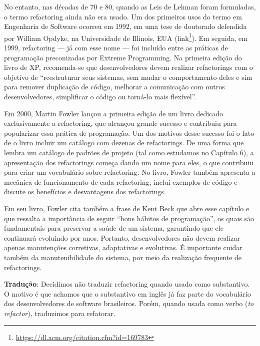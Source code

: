 \documentclass[
  11pt,
  twoside]{book}
\DeclareRobustCommand{\href}[2]{#2\footnote{\url{#1}}}
\newenvironment{aviso}{\centering \vspace{1.5ex} \begin{tcolorbox}[breakable, colback=backcolor, width=4.9in]}{\end{tcolorbox} \vspace{1.5ex}}
\begin{document}
 No entanto, nas décadas de 70 e 80, quando as
Leis de Lehman foram formuladas, o termo refactoring ainda não era
usado. Um dos primeiros usos do termo em Engenharia de Software ocorreu
em 1992, em uma tese de doutorado defendida por William Opdyke, na
Universidade de Illinois, EUA
(\href{https://dl.acm.org/citation.cfm?id=169783}{link}). Em seguida, em
1999, refactoring --- já com esse nome --- foi incluído entre as
práticas de programação preconizadas por Extreme Programming. Na
primeira edição do livro de XP, recomenda-se que desenvolvedores devem
realizar refactorings com o objetivo de ``reestruturar seus sistemas,
sem mudar o comportamento deles e sim para remover duplicação de código,
melhorar a comunicação com outros desenvolvedores, simplificar o código
ou torná-lo mais flexível''.

 Em 2000, Martin Fowler lançou a primeira edição
de um livro dedicado exclusivamente a refactoring, que alcançou grande
sucesso e contribuiu para popularizar essa prática de programação. Um
dos motivos desse sucesso foi o fato de o livro incluir um catálogo com
dezenas de refactorings. De uma forma que lembra um catálogo de padrões
de projeto (tal como estudamos no Capítulo 6), a apresentação dos
refactorings começa dando um nome para eles, o que contribuiu para criar
um vocabulário sobre refactoring. No livro, Fowler também apresenta a
mecânica de funcionamento de cada refactoring, inclui exemplos de código
e discute os benefícios e desvantagens dos refactorings.

 Em seu livro, Fowler cita também a frase de Kent Beck
que abre esse capítulo e que ressalta a importância de seguir ``bons
hábitos de programação'', os quais são fundamentais para preservar a
saúde de um sistema, garantindo que ele continuará evoluindo por anos.
Portanto, desenvolvedores não devem realizar apenas manutenções
corretivas, adaptativas e evolutivas. É importante cuidar também da
manutenibilidade do sistema, por meio da realização frequente de
refactorings.

\begin{aviso}

\textbf{Tradução}: Decidimos não traduzir refactoring quando usado como
substantivo. O motivo é que achamos que o substantivo em inglês já faz
parte do vocabulário dos desenvolvedores de software brasileiros. Porém,
quando usada como verbo (\emph{to refactor}), traduzimos para refatorar.

\end{aviso}
\end{document}
